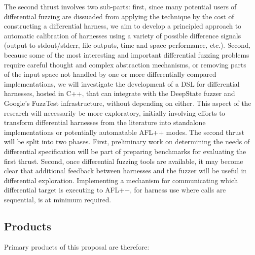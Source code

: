 The second thrust involves two sub-parts: first, since many potential users of
differential fuzzing are dissuaded from applying the technique by the
cost of constructing a differential harness, we aim to develop a
principled approach to automatic calibration of harnesses using a
variety of possible difference signals (output to stdout/stderr, file
outputs, time and space performance, etc.).  Second, because some of
the most interesting and important differential fuzzing problems
require careful thought and complex abstraction mechanisms, or
removing parts of the input space not handled by one or more
differentially compared implementations, we will investigate the
development of a DSL for differential harnesses, hosted in C++, that
can integrate with the DeepState fuzzer and Google's FuzzTest
infrastructure, without depending on either.  This aspect of the
research will necessarily be more exploratory, initially involving
efforts to transform differential harnesses from the literature into
standalone implementations or potentially automatable AFL++ modes.
The second thrust will be split into two phases.  First, preliminary
work on determining the needs of differential specification will be
part of preparing benchmarks for evaluating the first thrust.  Second,
once differential fuzzing tools are available, it may become clear
that additional feedback between harnesses and the fuzzer will be
useful in differential exploration.  Implementing a mechanism for
communicating which differential target is executing to AFL++, for
harness use where calls are sequential, is at minimum required.

\subsection{Products}

Primary products of this proposal are therefore:

